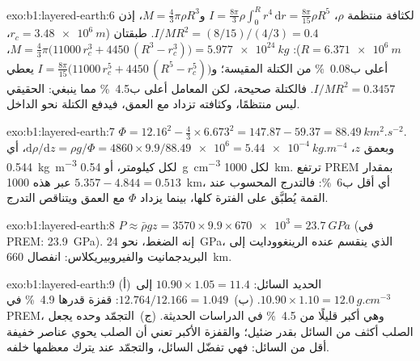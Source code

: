 \begin{solution}{exo:b1:layered-earth:6}
لكثافة منتظمة $\rho$، $I = \tfrac{8\pi}{3}\rho\int_0^R r^4\,\mathrm dr =
\tfrac{8\pi}{15}\rho R^5$ و$M = \tfrac43\pi\rho R^3$، إذن
$I/MR^2 = (8/15)/(4/3) = 0.4$. طبقتان ($r_c = \qty{3.48e6}{m}$،
$R = \qty{6.371e6}{m}$): $M = \tfrac43\pi\bigl(11000\,r_c^3 + 4450\,(R^3 -
r_c^3)\bigr) = \qty{5.977e24}{kg}$، أعلى ب\qty{0.08}{\percent} من الكتلة المقيسة؛ و$I = \tfrac{8\pi}{15}\bigl(11000\,r_c^5 + 4450\,(R^5 - r_c^5)\bigr)$ يعطي
$I/MR^2 = 0.3457$. فالكتلة صحيحة، لكن المعامل أعلى ب\qty{4.5}{\percent} مما ينبغي:  الحقيقي ليس منتظمًا، وكثافته تزداد مع العمق، فيدفع الكتلة نحو الداخل.
\end{solution}

\begin{solution}{exo:b1:layered-earth:7}
$\Phi = 12.16^2 - \tfrac43\times6.673^2 = 147.87 - 59.37 =
\qty{88.49}{km^2.s^{-2}}$. وبعمق $z$،
$\mathrm d\rho/\mathrm dz = \rho g/\Phi = 4860\times9.9/\num{88.49e6} =
\qty{5.44e-4}{kg.m^{-4}}$، أي \qty{0.544}{kg.m^{-3}} لكل كيلومتر، أو
\qty{0.54}{g.cm^{-3}} لكل \qty{1000}{km}. ترتفع PREM بمقدار $5.357 - 4.844 =
0.513$ عبر هذه \qty{1000}{km}، أي أقل ب\qty{6}{\percent}: فالتدرج المحسوب عند القمة يُطبَّق على الفترة كلها، بينما يزداد $\Phi$ مع العمق ويتناقص التدرج.
\end{solution}

\begin{solution}{exo:b1:layered-earth:8}
$P \approx \bar\rho g z = 3570\times9.9\times\num{670e3} = \qty{23.7}{GPa}$
(في PREM: \qty{23.9}{GPa}). إنه الضغط، نحو \qty{24}{GPa}، الذي ينقسم عنده الرينغوودايت إلى البريدجمانيت والفيروبيريكلاس: انفصال \qty{660}{km}.
\end{solution}

\begin{solution}{exo:b1:layered-earth:9}
(أ)~الحديد السائل: $10.90\times1.05 = 11.4$ إلى $10.90\times1.10 =
\qty{12.0}{g.cm^{-3}}$. (ب)~$12.764/12.166 = 1.049$: قفزة قدرها
\qty{4.9}{\percent} في PREM، وهي أكبر قليلًا من \qty{4.5}{\percent} في الدراسات الحديثة. (ج)~التجمّد وحده يجعل الصلب أكثف من السائل بقدر ضئيل؛ والقفزة الأكبر تعني أن الصلب يحوي عناصر خفيفة أقل من السائل: فهي تفضّل السائل، والتجمّد عند  يترك معظمها خلفه.
\end{solution}


